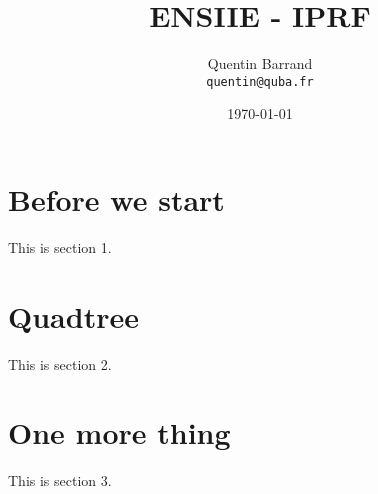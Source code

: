 \documentclass[11pt]{article}
\title{\textbf{ENSIIE - IPRF}}
\author{Quentin Barrand\\
		\texttt{quentin@quba.fr}}
\date{\today}
\begin{document}
\maketitle

\section{Before we start}

This is section 1.

\section{Quadtree}

This is section 2.

\section{One more thing}

This is section 3.
\end{document}
